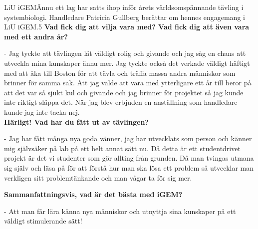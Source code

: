 \begin{news}{3}{LiU iGEM}{Ännu ett lag
  har satts ihop inför årets världsomspännande tävling i
  systembiologi. Handledare Patricia Gullberg berättar om hennes
  engagemang i LiU iGEM.}{}{5}
 \noindent \textbf{Vad fick dig att vilja vara med? Vad fick dig att även vara
    med ett andra år?}

  - Jag tyckte att tävlingen lät väldigt rolig och
  givande och jag såg en chans att utveckla mina kunskaper ännu
  mer. Jag tyckte också det verkade väldigt häftigt med att åka till
  Boston för att tävla och träffa massa andra människor som brinner
  för samma sak. Att jag valde att vara med ytterligare ett år till
  beror på att det var så sjukt kul och givande och jag brinner för
  projektet så jag kunde inte riktigt släppa det. När jag blev
  erbjuden en anställning som handledare kunde jag inte tacka nej.
\\

 \noindent \textbf{Härligt! Vad har du fått ut av tävlingen?}

  - Jag har fått många
  nya goda vänner, jag har utvecklats som person och känner mig
  självsäker på lab på ett helt annat sätt nu. Då detta är ett
  studentdrivet projekt är det vi studenter som gör allting från
  grunden. Då man tvingas utmana sig själv och läsa på för att förstå
  hur man ska lösa ett problem så utvecklar man verkligen sitt
  problemtänkande och man vågar ta för sig mer.
\\



 \noindent \textbf{Sammanfattningsvis, vad är det bästa med iGEM?}

  - Att man får
  lära känna nya människor och utnyttja sina kunskaper på ett väldigt
  stimulerande sätt!
\end{news}
